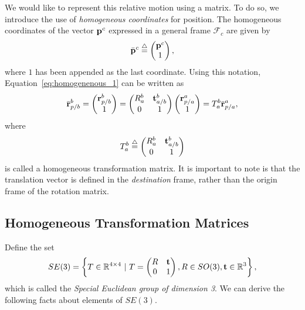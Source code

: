 We would like to represent this relative motion using a matrix.  
%
To do so, we introduce the use of {\em homogeneous coordinates} for position.  The homogeneous coordinates of the vector $\mathbf{p}^c$ expressed in a general frame $\mathcal{F}_c$ are given by
\[
\bar{\mathbf{p}}^c \stackrel{\triangle}{=} \begin{pmatrix} \mathbf{p}^c \\ 1 \end{pmatrix},
\]
where $1$ has been appended as the last coordinate.  
%
Using this notation, Equation~\eqref{eq:homogenenous_1} can be written as
\[
\bar{\mathbf{r}}_{p/b}^b = \begin{pmatrix} \mathbf{r}_{p/b}^b \\ 1 \end{pmatrix} = \begin{pmatrix} R_a^b & \mathbf{t}_{a/b}^b \\ 0 & 1 \end{pmatrix}\begin{pmatrix} \mathbf{r}_{p/a}^a \\ 1 \end{pmatrix} = T_a^b \bar{\mathbf{r}}_{p/a}^a,
\]
where
\[
T_a^b \stackrel{\triangle}{=} \begin{pmatrix} R_a^b & \mathbf{t}_{a/b}^b \\ 0 & 1 \end{pmatrix}
\]
is called a homogeneous transformation matrix.
%
It is important to note is that the translation
vector is defined in the \emph{destination} frame, rather than the
origin frame of the rotation matrix. 

%
%
%
%

\subsection{Homogeneous Transformation Matrices}

Define the set
\[
SE(3) = \left\{T\in\mathbb{R}^{4\times 4} ~|~ T=\begin{pmatrix} R & \mathbf{t} \\ 0 & 1\end{pmatrix}, R\in SO(3), \mathbf{t}\in\mathbb{R}^3 \right\},
\]
which is called the {\em Special Euclidean group of dimension 3}.  We can derive the following facts about elements of $SE(3)$.

